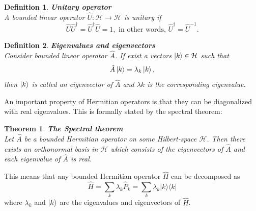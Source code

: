 \documentclass[12pt, a4paper,  nobibnotes]{article}
\newcommand{\ketbra}[2]{|#1\rangle\langle#2|}
\newtheorem{theorem}{Theorem}
\newtheorem{definition}{Definition}
\begin{document}
\begin{definition}
    \textbf{Unitary operator}
    \\A bounded linear operator $\hat U : \mathcal H\rightarrow \mathcal H$ is unitary if 
    \begin{equation}
        \hat U\hat U^\dagger = \hat U^\dagger \hat U = 1, \textrm{ in other words, } \hat U^{\dagger} = \hat U^{-1}. 
    \end{equation}
\end{definition}

\begin{definition}
    \textbf{Eigenvalues and eigenvectors}
    \\Consider bounded linear operator $\hat A$. If exist a vectors $\ket k \in \mathcal H$ such that
    \begin{equation}
        \hat A \ket k = \lambda_k\ket k,
    \end{equation}
    then $\ket k$ is called an eigenvector of $\hat A$ and $\lambda k$ is the corresponding eigenvalue.
\end{definition}

An important property of Hermitian operators is that they can be diagonalized with real eigenvalues. 
This is formally stated by the spectral theorem:
\begin{theorem}
    \textbf{The Spectral theorem}
    \\Let $\hat A$ be a bounded Hermitian operator on some Hilbert-space $\mathcal H$. Then there exists an orthonormal
    basis in $\mathcal H$ which consists of the eigenvectors of $\hat A$ and each eigenvalue of $\hat A$ is real.
\end{theorem}
This means that any bounded Hermitian operator $\hat H$ can be decomposed as 
\begin{equation}
    \hat H = \sum\limits_{k}\lambda_k \hat P_k = \sum\limits_{k}\lambda_k \ketbra{k}{k}
\end{equation}
where $\lambda_k$ and $\ket k$ are the eigenvalues and eigenvectors of $\hat H$.
\end{document}

